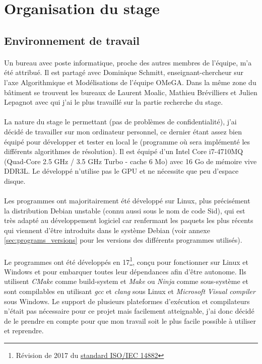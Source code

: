 \documentclass[a4paper,11pt,twoside,french,report]{../common/simplem}
\begin{document}
		\section{Organisation du stage}\label{sec:organisation_stage}
			\subsection{Environnement de travail}
				\paragraph*{}
					Un bureau avec poste informatique, proche des autres membres de l'équipe, m'a été attribué. Il est partagé avec Dominique Schmitt, enseignant-chercheur sur l'axe Algorithmique et Modélisations de l'équipe \gls{OMeGA}. Dans la même zone du bâtiment se trouvent les bureaux de Laurent Moalic, Mathieu Brévilliers et Julien Lepagnot avec qui j'ai le plus travaillé sur la partie recherche du stage.
				\paragraph*{}
					La nature du stage le permettant (pas de problèmes de confidentialité), j'ai décidé de travailler sur mon ordinateur personnel, ce dernier étant assez bien équipé pour développer et tester en local le \solver{} (programme où sera implémenté les différents algorithmes de résolution). Il est équipé d'un Intel Core i7-4710MQ (Quad-Core 2.5 GHz / 3.5 GHz Turbo - cache 6 Mo) avec 16 Go de mémoire vive DDR3L. Le \solver{} développé n'utilise pas le GPU et ne nécessite que peu d'espace disque.
				\paragraph*{}
					Les programmes ont majoritairement été développé sur Linux, plus précisément la distribution Debian unstable (connu aussi sous le nom de code Sid), qui est très adapté au développement logiciel car renfermant les paquets les plus récents qui viennent d'être introduits dans le système Debian (voir annexe \ref{sec:programs_versions} pour les versions des différents programmes utilisés).
				\paragraph*{}
					Le programmes ont été développés en \Cpp{}17\footnote{Révision de 2017 du \href{https://www.iso.org/standard/68564.html}{standard ISO/IEC 14882}}, conçu pour fonctionner sur Linux et Windows et pour embarquer toutes leur dépendances afin d'être autonome. Ils utilisent \textit{CMake} comme build-system et \textit{Make} ou \textit{Ninja} comme sous-système et sont compilables en utilisant \textit{gcc} et \textit{clang} sous Linux et \textit{Microsoft Visual \Cpp{} compiler} sous Windows. Le support de plusieurs plateformes d'exécution et compilateurs n'était pas nécessaire pour ce projet mais facilement atteignable, j'ai donc décidé de le prendre en compte pour que mon travail soit le plus facile possible à utiliser et reprendre.
\end{document}
